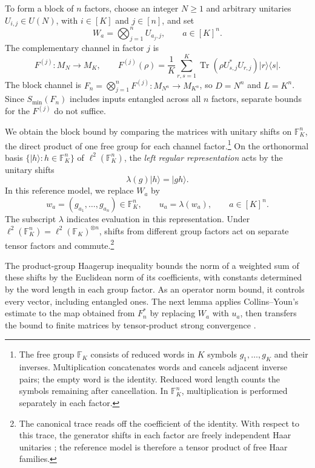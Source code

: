 \documentclass[11pt]{article}
\numberwithin{equation}{section}
\theoremstyle{boldremark}\newtheorem{remark}[theorem]{Remark}
\DeclareMathOperator{\Tr}{Tr}
\newcommand{\F}{\mathbb F}
\newcommand{\M}{M}
\newcommand{\smin}{S_{\min}}
\newcommand{\ket}[1]{\lvert #1\rangle}
\newcommand{\bra}[1]{\langle #1\rvert}
\begin{document}
To form a block of $n$ factors, choose an integer $N\ge1$ and arbitrary unitaries
$U_{i,j}\in U(N)$, with $i\in[K]$ and $j\in[n]$, and set
\begin{equation}
 W_a=\bigotimes_{j=1}^n U_{a_j,j},\qquad a\in[K]^n.
 \label{eq:tensor-words}
\end{equation}
The complementary channel in factor $j$ is
\[
 F^{(j)}:\M_N\longrightarrow\M_K,\qquad
 F^{(j)}(\rho)=\frac1K\sum_{r,s=1}^K
 \Tr(\rho U_{s,j}^*U_{r,j})\ket r\bra s.
\]
The block channel is
$F_n=\bigotimes_{j=1}^n F^{(j)}:\M_{N^n}\to\M_{K^n}$, so
$D=N^n$ and $L=K^n$. Since $\smin(F_n)$ includes inputs
entangled across all $n$ factors, separate bounds for the $F^{(j)}$
do not suffice.

We obtain the block bound by comparing the matrices with unitary
shifts on $\F_K^n$, the direct product of one free
group for each channel factor.\footnote{The free group $\F_K$ consists of
reduced words in $K$ symbols $g_1,\ldots,g_K$ and their inverses.
Multiplication concatenates words and cancels adjacent inverse pairs;
the empty word is the identity. Reduced word length counts the symbols
remaining after cancellation. In $\F_K^n$, multiplication is performed
separately in each factor.}
On the orthonormal basis $\{\ket h:h\in\F_K^n\}$ of
$\ell^2(\F_K^n)$, the \emph{left regular representation}
acts by the unitary shifts
\[
 \lambda(g)\ket h=\ket{gh}.
\]
In this reference model, we replace $W_a$ by
\[
 w_a=(g_{a_1},\ldots,g_{a_n})\in\F_K^n,
 \qquad u_a=\lambda(w_a),\qquad a\in[K]^n.
\]
The subscript $\lambda$ indicates evaluation in this representation.
Under $\ell^2(\F_K^n)=\ell^2(\F_K)^{\otimes n}$, shifts from
different group factors act on separate tensor factors and commute.\footnote{The
canonical trace reads off the coefficient of the identity. With respect
to this trace, the generator shifts in each factor are freely independent
Haar unitaries \cite{NicaSpeicher}; the reference model is therefore a
tensor product of free Haar families.}

The product-group Haagerup inequality bounds the norm of a weighted sum
of these shifts by the Euclidean norm of its coefficients, with constants
determined by the word length in each group factor. As an operator norm
bound, it controls every vector, including entangled ones. The next
lemma applies Collins--Youn's estimate \cite[Theorem~3.3]{CY} to the
map obtained from $F_n^*$ by replacing $W_a$ with $u_a$, then
transfers the bound to finite matrices by tensor-product strong
convergence \cite[Theorem~9.2]{BC}.
\end{document}
